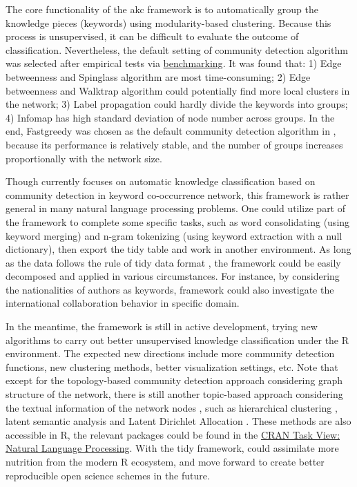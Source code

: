 The core functionality of the akc framework is to automatically group
the knowledge pieces (keywords) using modularity-based clustering.
Because this process is unsupervised, it can be difficult to evaluate
the outcome of classification. Nevertheless, the default setting of
community detection algorithm was selected after empirical tests via
\href{https://cran.r-project.org/web/packages/akc/vignettes/Benchmarking.html}{benchmarking}.
It was found that: 1) Edge betweenness and Spinglass algorithm are most
time-consuming; 2) Edge betweenness and Walktrap algorithm could
potentially find more local clusters in the network; 3) Label
propagation could hardly divide the keywords into groups; 4) Infomap has
high standard deviation of node number across groups. In the end,
Fastgreedy was chosen as the default community detection algorithm in
, because its performance is relatively stable, and the
number of groups increases proportionally with the network size.

Though  currently focuses on automatic knowledge
classification based on community detection in keyword co-occurrence
network, this framework is rather general in many natural language
processing problems. One could utilize part of the framework to complete
some specific tasks, such as word consolidating (using keyword merging)
and n-gram tokenizing (using keyword extraction with a null dictionary),
then export the tidy table and work in another environment. As long as
the data follows the rule of tidy data format
\citep{wickham2014tidy, Julia-3165010}, the  framework
could be easily decomposed and applied in various circumstances. For
instance, by considering the nationalities of authors as keywords,
 framework could also investigate the international
collaboration behavior in specific domain.

In the meantime, the  framework is still in active
development, trying new algorithms to carry out better unsupervised
knowledge classification under the R environment. The expected new
directions include more community detection functions, new clustering
methods, better visualization settings, etc. Note that except for the
topology-based community detection approach considering graph structure
of the network, there is still another topic-based approach considering
the textual information of the network nodes \citep{Ding-629}, such as
hierarchical clustering \citep{Newman-633}, latent semantic analysis
\citep{LandauerFoltz-635} and Latent Dirichlet Allocation
\citep{BleiNg-634}. These methods are also accessible in R, the relevant
packages could be found in the
\href{https://cran.r-project.org/web/views/NaturalLanguageProcessing.html}{CRAN
Task View: Natural Language Processing}. With the tidy framework,
 could assimilate more nutrition from the modern R
ecosystem, and move forward to create better reproducible open science
schemes in the future.

